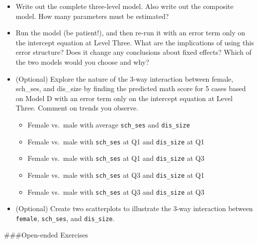 \documentclass[
]{krantz}
\providecommand{\tightlist}{%
  \setlength{\itemsep}{0pt}\setlength{\parskip}{0pt}}
\begin{document}
\begin{enumerate}
\begin{enumerate}
    \begin{itemize}
    \tightlist
    \item
      Write out the complete three-level model. Also write out the composite model.
      How many parameters must be estimated?\\
    \item
      Run the model (be patient!), and then re-run it with an error term only on the intercept
      equation at Level Three. What are the implications of using this error structure? Does
      it change any conclusions about fixed effects? Which of the two models would you choose
      and why?
    \item
      (Optional) Explore the nature of the 3-way interaction between female, sch\_ses, and
      dis\_size by finding the predicted math score for 5 cases based on Model D with an error term only
      on the intercept equation at Level Three. Comment on trends you observe.

      \begin{itemize}
      \tightlist
      \item
        Female vs.~male with average \texttt{sch\_ses} and \texttt{dis\_size}\\
      \item
        Female vs.~male with \texttt{sch\_ses} at Q1 and \texttt{dis\_size} at Q1\\
      \item
        Female vs.~male with \texttt{sch\_ses} at Q1 and \texttt{dis\_size} at Q3\\
      \item
        Female vs.~male with \texttt{sch\_ses} at Q3 and \texttt{dis\_size} at Q1\\
      \item
        Female vs.~male with \texttt{sch\_ses} at Q3 and \texttt{dis\_size} at Q3\\
      \end{itemize}
    \item
      (Optional) Create two scatterplots to illustrate the 3-way interaction between \texttt{female},
      \texttt{sch\_ses}, and \texttt{dis\_size}.
    \end{itemize}
  \end{enumerate}
\end{enumerate}

\#\#\#Open-ended Exercises
\end{document}
